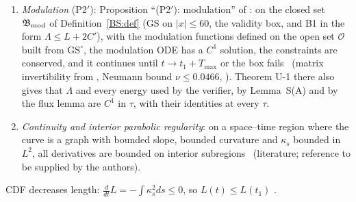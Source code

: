 \documentclass[11pt]{article}
\begin{document}
\begin{enumerate}[label=(P\arabic*$'$),leftmargin=3em]
\item \emph{Modulation} (P2$'$): Proposition ``(P2$'$): modulation'' of : on the closed set $\mathfrak B_{\rm mod}$ of Definition~\ref{BS:def} (GS on $|x|\le60$, the validity box, and B1 in the form $\Lambda\le L+2C'$), with the modulation functions defined on the open set $\mathcal O$ built from $\mathrm{GS}^\circ$, the modulation ODE has a $C^1$ solution, the constraints are conserved, and it continues until $t\to t_1+T_{\max}$ or the box fails \tH\ (matrix invertibility from , Neumann bound $\nu\le0.0466$, \tR). Theorem U-1 there also gives that $\Lambda$ and every energy used by the verifier, by Lemma~S(A) and by the flux lemma are $C^1$ in $\tau$, with their identities at every $\tau$.
\item \emph{Continuity and interior parabolic regularity}: on a space--time region where the curve is a graph with bounded slope, bounded curvature and $\kappa_s$ bounded in $L^2$, all derivatives are bounded on interior subregions \tH\ (literature; reference to be supplied by the authors).
\end{enumerate}
CDF decreases length: $\frac{d}{dt}L=-\int\kappa_s^2ds\le0$, so $L(t)\le L(t_1)$ \tP.
\end{document}
